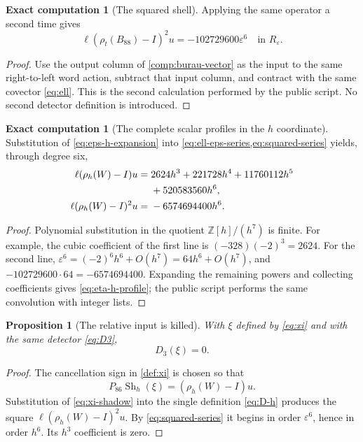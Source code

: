\documentclass[10pt,reqno]{amsart}
\newtheorem{proposition}[theorem]{Proposition}
\theoremstyle{definition}
\newtheorem{computation}[theorem]{Exact computation}
\theoremstyle{remark}
\newcommand{\Z}{\mathbb Z}
\newcommand{\Sh}{\operatorname{Sh}}
\newcommand{\eps}{\varepsilon}
\begin{document}
\begin{computation}[The squared shell]\label{comp:squared-shell}
Applying the same operator a second time gives
\begin{equation}\label{eq:squared-series}
\ell(\rho_t(B_{88})-I)^2u=-102729600\eps^6
\quad\text{in }R_\eps.
\end{equation}
\end{computation}

\begin{proof}
Use the output column of \cref{comp:burau-vector} as the input to the same
right-to-left word action, subtract that input column, and contract with the
same covector \cref{eq:ell}.  This is the second calculation performed by the
public script.  No second detector definition is introduced.
\end{proof}

\begin{computation}[The complete scalar profiles in the $h$ coordinate]\label{comp:h-profiles}
Substitution of \cref{eq:eps-h-expansion} into
\cref{eq:ell-eps-series,eq:squared-series} yields, through degree six,
\begin{align}
\ell(\rho_h(W)-I)u
={}&2624h^3+221728h^4+11760112h^5
\notag\\
&+520583560h^6, \label{eq:eta-h-profile}\\
\ell(\rho_h(W)-I)^2u
={}&-6574694400h^6. \label{eq:xi-h-profile}
\end{align}
\end{computation}

\begin{proof}
Polynomial substitution in the quotient $\Z[h]/(h^7)$ is finite.  For
example, the cubic coefficient of the first line is
$(-328)(-2)^3=2624$.  For the second line,
$\eps^6=(-2)^6h^6+O(h^7)=64h^6+O(h^7)$, and
$-102729600\cdot64=-6574694400$.  Expanding the remaining powers and collecting
coefficients gives \cref{eq:eta-h-profile}; the public script performs the
same convolution with integer lists.
\end{proof}

\begin{proposition}[The relative input is killed]\label{prop:D3-xi}
With $\xi$ defined by \cref{eq:xi} and with the same detector
\cref{eq:D3},
\begin{equation}\label{eq:D3-xi}
D_3(\xi)=0.
\end{equation}
\end{proposition}

\begin{proof}
The cancellation sign in \cref{def:xi} is chosen so that
\begin{equation}\label{eq:xi-shadow}
P_{86}\Sh_h(\xi)=(\rho_h(W)-I)u.
\end{equation}
Substitution of \cref{eq:xi-shadow} into the single definition
\cref{eq:D-h} produces the square
$\ell(\rho_h(W)-I)^2u$.  By \cref{eq:squared-series} it begins in order
$\eps^6$, hence in order $h^6$.  Its $h^3$ coefficient is zero.
\end{proof}
\end{document}
